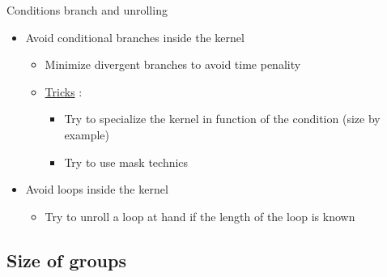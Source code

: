\documentclass{beamer}
\begin{document}
\begin{frame}{Conditions branch and unrolling}

  \begin{itemize}
  \item Avoid conditional branches inside the kernel
    \begin{itemize}
    \item Minimize divergent branches to avoid time penality
    \item \underline{Tricks} :
      \begin{itemize}
      \item Try to specialize the kernel in function of the condition
        (size by example)
      \item Try to use mask technics
      \end{itemize}
    \end{itemize}
  \item  Avoid loops inside the kernel
    \begin{itemize}
    \item Try to unroll a loop at hand if the length of the loop is known
    \end{itemize}
\end{itemize}
\end{frame}

\subsection{Size of groups}
\end{document}
